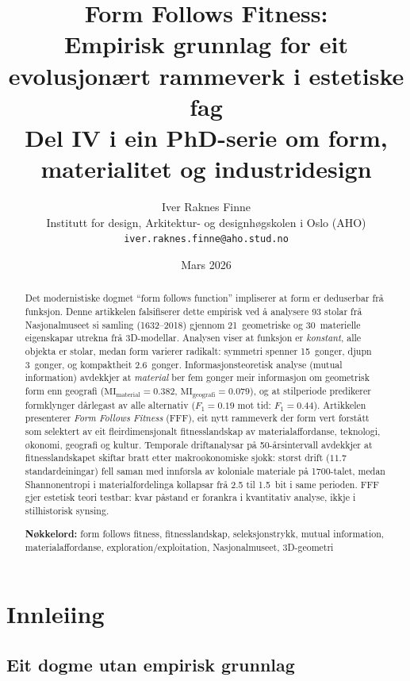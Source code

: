 \documentclass[12pt,a4paper]{article}
\title{Form Follows Fitness:\\
\large Empirisk grunnlag for eit evolusjon\ae{}rt rammeverk i estetiske fag\\[0.5em]
\normalsize Del IV i ein PhD-serie om form, materialitet og industridesign}
\author{Iver Raknes Finne\\
\small Institutt for design, Arkitektur- og designh\o{}gskolen i Oslo (AHO)\\
\small\texttt{iver.raknes.finne@aho.stud.no}}
\date{Mars 2026}
\begin{document}
\maketitle

\begin{abstract}
\noindent
Det modernistiske dogmet \enquote{form follows function} impliserer at form er deduserbar fr\aa{} funksjon. Denne artikkelen falsifiserer dette empirisk ved \aa{} analysere 93 stolar fr\aa{} Nasjonalmuseet si samling (1632--2018) gjennom 21~geometriske og 30~materielle eigenskapar utrekna fr\aa{} 3D-modellar. Analysen viser at funksjon er \emph{konstant}, alle objekta er stolar, medan form varierer radikalt: symmetri spenner 15~gonger, djupn 3~gonger, og kompaktheit 2.6~gonger. Informasjonsteoretisk analyse (mutual information) avdekkjer at \emph{material} ber fem gonger meir informasjon om geometrisk form enn geografi ($\mathrm{MI_{material}} = 0.382$, $\mathrm{MI_{geografi}} = 0.079$), og at stilperiode predikerer formklynger d\aa{}rlegast av alle alternativ ($F_1 = 0.19$ mot tid: $F_1 = 0.44$). Artikkelen presenterer \emph{Form Follows Fitness} (FFF), eit nytt rammeverk der form vert forst\aa{}tt som selektert av eit fleirdimensjonalt fitnesslandskap av materialaffordanse, teknologi, \o{}konomi, geografi og kultur. Temporale driftanalysar p\aa{} 50-\aa{}rsintervall avdekkjer at fitnesslandskapet skiftar bratt etter makro\o{}konomiske sjokk: st\o{}rst drift ($11.7$ standardeiningar) fell saman med innf\o{}rsla av koloniale materiale p\aa{} 1700-talet, medan Shannonentropi i materialfordelinga kollapsar fr\aa{} 2.5 til 1.5~bit i same perioden. FFF gjer estetisk teori testbar: kvar p\aa{}stand er forankra i kvantitativ analyse, ikkje i stilhistorisk synsing.

\medskip
\noindent\textbf{N\o{}kkelord:} form follows fitness, fitnesslandskap, seleksjonstrykk, mutual information, materialaffordanse, exploration/exploitation, Nasjonalmuseet, 3D-geometri
\end{abstract}

\section{Innleiing}
\label{sec:innleiing}

\subsection{Eit dogme utan empirisk grunnlag}
\end{document}
